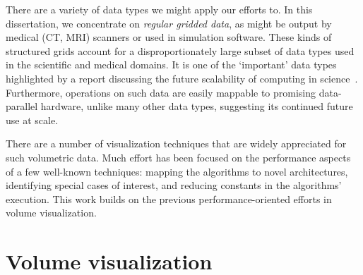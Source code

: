 There are a variety of data types we might apply our efforts to.  In
this dissertation, we concentrate on \textit{regular gridded
data}, as might be output by medical (CT, MRI) scanners or used in
simulation software.  These kinds of structured grids account for a
disproportionately large subset of data types used in the scientific
and medical domains.  It is one of the `important' data types
highlighted by a report discussing the future scalability of computing
in
science~\cite{Berkeley:2006:View}.  Furthermore, operations on such
data are easily mappable to promising data-parallel hardware, unlike
many other data types, suggesting its continued future use at scale.



There are a number of visualization techniques that are widely
appreciated for such volumetric data.  Much effort has been focused
on the performance aspects of a few well-known techniques: mapping
the algorithms to novel architectures, identifying special cases of
interest, and reducing constants in the algorithms' execution.  This
work builds on the previous performance-oriented efforts in volume
visualization.


%
%

\section{Volume visualization}

